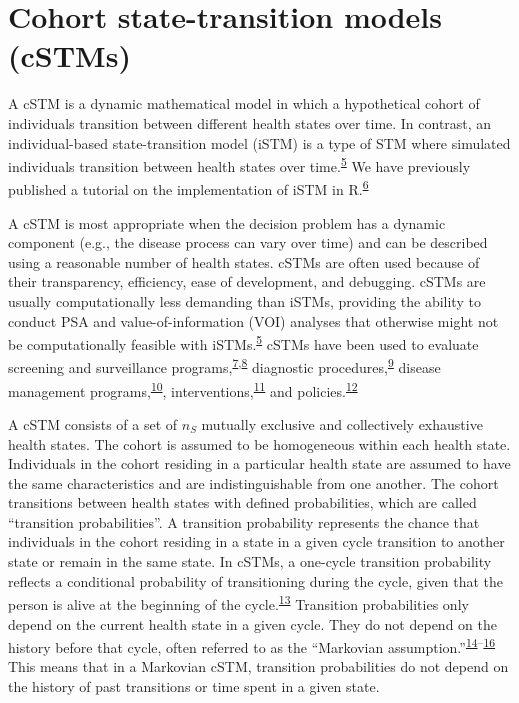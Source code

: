\documentclass[
]{article}
\begin{document}
\hypertarget{cohort-state-transition-models-cstms}{%
\section{Cohort state-transition models (cSTMs)}\label{cohort-state-transition-models-cstms}}

A cSTM is a dynamic mathematical model in which a hypothetical cohort of individuals transition between different health states over time. In contrast, an individual-based state-transition model (iSTM) is a type of STM where simulated individuals transition between health states over time.\textsuperscript{\protect\hyperlink{ref-Siebert2012c}{5}} We have previously published a tutorial on the implementation of iSTM in R.\textsuperscript{\protect\hyperlink{ref-Krijkamp2018}{6}}

A cSTM is most appropriate when the decision problem has a dynamic component (e.g., the disease process can vary over time) and can be described using a reasonable number of health states. cSTMs are often used because of their transparency, efficiency, ease of development, and debugging. cSTMs are usually computationally less demanding than iSTMs, providing the ability to conduct PSA and value-of-information (VOI) analyses that otherwise might not be computationally feasible with iSTMs.\textsuperscript{\protect\hyperlink{ref-Siebert2012c}{5}} cSTMs have been used to evaluate screening and surveillance programs,\textsuperscript{\protect\hyperlink{ref-Suijkerbuijk2018}{7},\protect\hyperlink{ref-Sathianathen2018a}{8}} diagnostic procedures,\textsuperscript{\protect\hyperlink{ref-Lu2018b}{9}} disease management programs,\textsuperscript{\protect\hyperlink{ref-Djatche2018}{10}}, interventions,\textsuperscript{\protect\hyperlink{ref-Smith-Spangler2010}{11}} and policies.\textsuperscript{\protect\hyperlink{ref-Pershing2014}{12}}

A cSTM consists of a set of \(n_S\) mutually exclusive and collectively exhaustive health states. The cohort is assumed to be homogeneous within each health state. Individuals in the cohort residing in a particular health state are assumed to have the same characteristics and are indistinguishable from one another. The cohort transitions between health states with defined probabilities, which are called ``transition probabilities''. A transition probability represents the chance that individuals in the cohort residing in a state in a given cycle transition to another state or remain in the same state. In cSTMs, a one-cycle transition probability reflects a conditional probability of transitioning during the cycle, given that the person is alive at the beginning of the cycle.\textsuperscript{\protect\hyperlink{ref-Miller1994}{13}}
Transition probabilities only depend on the current health state in a given cycle. They do not depend on the history before that cycle, often referred to as the ``Markovian assumption.''\textsuperscript{\protect\hyperlink{ref-Kuntz2001}{14}--\protect\hyperlink{ref-Beck1983}{16}} This means that in a Markovian cSTM, transition probabilities do not depend on the history of past transitions or time spent in a given state.
\end{document}

